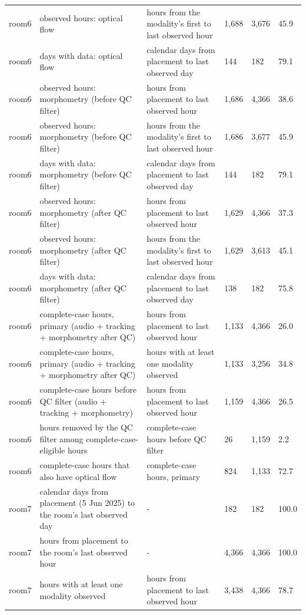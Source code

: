 \begin{tabular}{llllll}
room6 & observed hours: optical flow & hours from the modality's first to last observed hour & 1,688 & 3,676 & 45.9 \\
room6 & days with data: optical flow & calendar days from placement to last observed day & 144 & 182 & 79.1 \\
room6 & observed hours: morphometry (before QC filter) & hours from placement to last observed hour & 1,686 & 4,366 & 38.6 \\
room6 & observed hours: morphometry (before QC filter) & hours from the modality's first to last observed hour & 1,686 & 3,677 & 45.9 \\
room6 & days with data: morphometry (before QC filter) & calendar days from placement to last observed day & 144 & 182 & 79.1 \\
room6 & observed hours: morphometry (after QC filter) & hours from placement to last observed hour & 1,629 & 4,366 & 37.3 \\
room6 & observed hours: morphometry (after QC filter) & hours from the modality's first to last observed hour & 1,629 & 3,613 & 45.1 \\
room6 & days with data: morphometry (after QC filter) & calendar days from placement to last observed day & 138 & 182 & 75.8 \\
room6 & complete-case hours, primary (audio + tracking + morphometry after QC) & hours from placement to last observed hour & 1,133 & 4,366 & 26.0 \\
room6 & complete-case hours, primary (audio + tracking + morphometry after QC) & hours with at least one modality observed & 1,133 & 3,256 & 34.8 \\
room6 & complete-case hours before QC filter (audio + tracking + morphometry) & hours from placement to last observed hour & 1,159 & 4,366 & 26.5 \\
room6 & hours removed by the QC filter among complete-case-eligible hours & complete-case hours before QC filter & 26 & 1,159 & 2.2 \\
room6 & complete-case hours that also have optical flow & complete-case hours, primary & 824 & 1,133 & 72.7 \\
room7 & calendar days from placement (5 Jun 2025) to the room's last observed day & - & 182 & 182 & 100.0 \\
room7 & hours from placement to the room's last observed hour & - & 4,366 & 4,366 & 100.0 \\
room7 & hours with at least one modality observed & hours from placement to last observed hour & 3,438 & 4,366 & 78.7 \\

\end{tabular}
